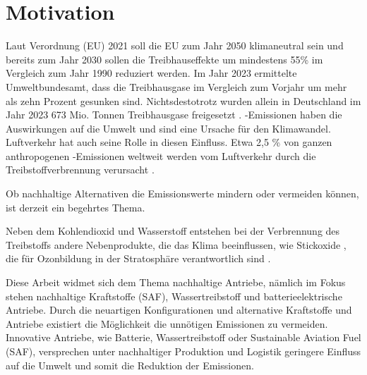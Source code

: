 \chapter{Motivation}
\label{ch:Einleitung}

Laut Verordnung (EU) 2021 soll die EU zum Jahr 2050 klimaneutral sein und bereits zum Jahr 2030 sollen die Treibhauseffekte um mindestens 55\%
im Vergleich zum Jahr 1990 reduziert werden.
Im Jahr 2023 ermittelte Umweltbundesamt, dass die Treibhausgase im Vergleich zum Vorjahr um mehr als zehn Prozent gesunken sind.
Nichtsdestotrotz wurden allein in Deutschland im Jahr 2023 673 Mio. Tonnen Treibhausgase freigesetzt \cite{bundesregierung}.
-Emissionen haben die Auswirkungen auf die Umwelt und sind eine Ursache für den Klimawandel. Luftverkehr hat auch seine Rolle in diesen Einfluss. 
Etwa 2,5 \% von ganzen anthropogenen -Emissionen weltweit werden vom Luftverkehr
durch die Treibstoffverbrennung verursacht \cite{conrady2019luftverkehr}.

Ob nachhaltige Alternativen die Emissionswerte mindern oder vermeiden können, ist derzeit ein begehrtes Thema. 


Neben dem Kohlendioxid  und Wasserstoff  entstehen bei der Verbrennung des Treibstoffs andere Nebenprodukte, die 
das Klima beeinflussen, wie Stickoxide , die für Ozonbildung in der Stratosphäre verantwortlich sind \cite{conrady2019luftverkehr}.

Diese Arbeit widmet sich dem Thema nachhaltige Antriebe, nämlich im Fokus stehen nachhaltige Kraftstoffe (SAF), Wassertreibstoff und 
batterieelektrische Antriebe.
Durch die neuartigen Konfigurationen und alternative Kraftstoffe und Antriebe existiert die Möglichkeit die unnötigen Emissionen zu vermeiden.
Innovative Antriebe, wie Batterie, Wassertreibstoff oder Sustainable Aviation Fuel (SAF), versprechen unter nachhaltiger Produktion und
Logistik geringere Einfluss auf die Umwelt und somit die Reduktion der Emissionen. 

